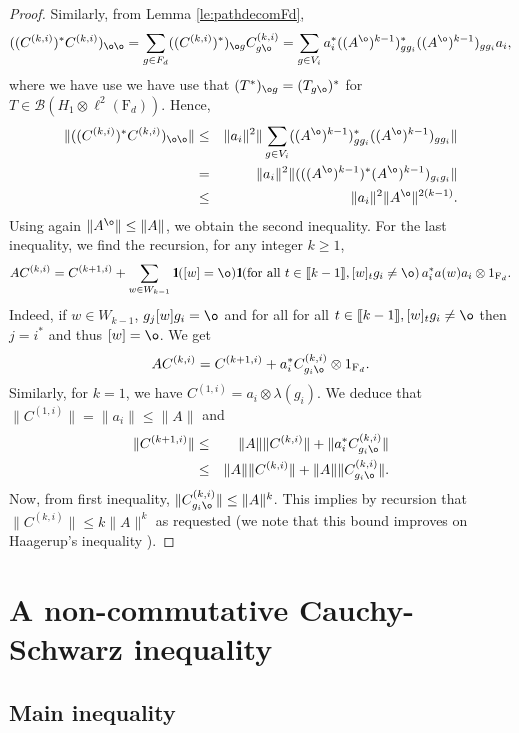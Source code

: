 \documentclass[11pt]{article}
\newcommand{\dF}{\mathrm{F}}
\newcommand{\cB}{\mathcal{B}}
\newcommand{\1}{1\!\!{\sf I}}
\newcommand{\IND}{\1}
\newcommand{\INT}[1]{{{\left[\hspace{-1.4pt}\left[#1\right]\hspace{-1.4pt}\right]}}}
\begin{document}
\begin{proof}
Similarly, from Lemma \ref{le:pathdecomFd},
$$
 ((C ^{(k,i)})^* C^{(k,i)})_{\o \o} = \sum_{g \in F_d}  ((C ^{(k,i)})^*)_{\o g} C^{(k,i)}_{g \o} =  \sum_{g \in V_i} a_i^* ((A^{\o})^{k-1} )^*_{g g_i} ((A^{\o})^{k-1} )_{g g_i} a_i ,
$$
where we have use we have use that $(T^*)_{\o g} = (T_{g \o } )^*$ for $T \in \cB ( H_1 \otimes \ell^2 (\dF_d))$. 
Hence, 
\begin{eqnarray*}
\| ((C ^{(k,i)})^* C^{(k,i)})_{\o \o} \| & \leq &  \| a_i \|^2  \| \sum_{g \in V_i} ((A^{\o})^{k-1} )^*_{g g_i} ((A^{\o})^{k-1} )_{g g_i} \| \\
&  =  &   \| a_i \|^2  \| (((A^{\o})^{k-1} )^* (A^{\o})^{k-1} )_{g_i g_i} \| \\
& \leq &   \| a_i \|^2   \| A^{\o} \|^{2 (k-1)}.
\end{eqnarray*}
Using again $\| A^{\o}\| \leq \| A\|$, we obtain the second inequality. 
For the last inequality, we find the recursion, for any integer $k \geq 1$,
$$
A C^{(k,i)} = C^{(k +1,i)} +  \sum_{w \in W_{k-1}} \IND( [w] = \o)  \IND ( \hbox{for all } t\in \INT{k-1}, [w]_t g_i \ne \o ) \, a_i^* a(w) a_i \otimes 1_{\dF_d}.
$$
Indeed, if $w \in W_{k-1}$,  $g_j [w] g_i = \o$ and for all for all $ t\in \INT{k-1}, [w]_t g_i \ne \o$ then $j = i^*$ and thus $[w] = \o$.  We get 
$$
A C^{(k,i)} = C^{(k+1,i)} +  a^*_i C  ^{(k,i)}_{g_i \o} \otimes 1_{\dF_d}.
$$
Similarly, for $k =1$, we have $C^{(1,i)} = a_i \otimes \lambda(g_i)$. We deduce that $\| C^{(1,i)} \| = \| a_i \|  \leq  \| A \|$ and
\begin{eqnarray*}
\|C^{(k+1,i)} \| & \leq  & \|A \| \| C^{(k,i)} \| + \|  a_i^* C  ^{(k,i)}_{g_i \o}\| \\
& \leq & \|A \| \|C^{(k,i)}\| + \|A \|  \|C  ^{(k,i)}_{g_i \o} \|.
\end{eqnarray*}
Now, from first inequality, $\|C  ^{(k,i)}_{g_i \o} \|   \leq \| A \|^{k}$. This implies by recursion that $\| C^{(k,i)} \| \leq  k \| A \|^k$ as requested (we note that this bound improves on Haagerup's inequality \cite{MR520930}).
\end{proof}

\section{A non-commutative Cauchy-Schwarz inequality}

\label{sec:NCCS}

\subsection{Main inequality}
\end{document}

